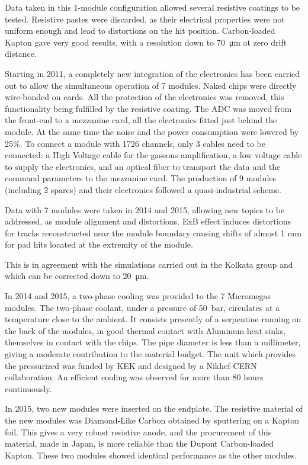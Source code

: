 Data taken in this 1-module configuration allowed several resistive coatings to be tested. Resistive pastes were discarded, as
their electrical properties were not uniform enough and lead to distortions on the hit position. Carbon-loaded Kapton gave
very good results, with a resolution down to \SI{70}{\micro m} at zero drift distance.

Starting in 2011, a completely new integration of the electronics has been carried out to allow the simultaneous operation
of 7 modules. Naked chips were directly wire-bonded on cards. All the protection of the electronics was removed, this functionality
being fulfilled by the resistive coating. The ADC was moved from the front-end to a mezzanine card, all the electronics fitted just behind the module.
At the same time the noise and the power consumption were lowered by 25\%. To connect a module with 1726 channels, only
3 cables need to be connected: a High Voltage cable for the gaseous amplification, a low voltage cable to supply the electronics,
and an optical fiber to transport the data and the command parameters to the mezzanine card.
The production of 9 modules (including 2 spares) and their electronics followed a quasi-industrial scheme.

Data with 7 modules were taken in 2014 and 2015, allowing new topics to be addressed, as module alignment and distortions.
ExB effect induces distortions for tracks reconstructed near the module boundary causing
shifts of almost 1 mm for pad hits located at the extremity of the module.


This is
in agreement with the simulations carried out in the Kolkata group and which can be corrected down to \SI{20}{\micro m}.

In 2014 and 2015, a two-phase  cooling was provided to the 7 Micromegas modules. The two-phase coolant, under a pressure of \SI{50}{bar}, circulates at a temperature close to the ambient.
It consists presently of a serpentine running on the back of the modules, in good thermal contact with Aluminum heat sinks, themselves in contact with the chips. The pipe diameter is less than a millimeter, giving a moderate contribution to the material budget. The unit
which provides the pressurized  was funded by KEK and designed by a Nikhef-CERN collaboration.
An efficient cooling was observed for more than 80 hours continuously.

In 2015, two new modules were inserted on the endplate. The resistive material of the new
modules was Diamond-Like Carbon obtained by sputtering on a Kapton foil.
This gives a very robust resistive anode, and the procurement of this material, made in Japan, is more reliable
than the Dupont Carbon-loaded Kapton. These two modules showed identical performance as the other modules.

